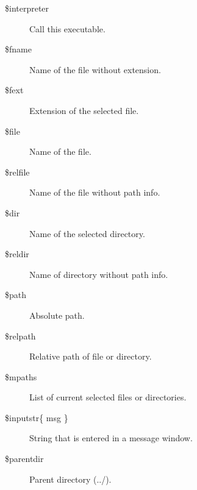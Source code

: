 
%
\begin{description}
\item[\$interpreter] Call this executable.              %
\item[\$fname] Name of the file without extension.      %
\item[\$fext] Extension of the selected file.           %
\item[\$file] Name of the file.                         %
\item[\$relfile] Name of the file without path info.    %
\item[\$dir] Name of the selected directory.            %
\item[\$reldir] Name of directory without path info.    %
\item[\$path] Absolute path.                            %
\item[\$relpath] Relative path of file or directory.    %
\item[\$mpaths] List of current selected files or directories. %
\item[\$inputstr\{ msg \}] String that is entered in a message window. %
\item[\$parentdir] Parent directory (../).              %
\end{description}

%
%
%
%
%
